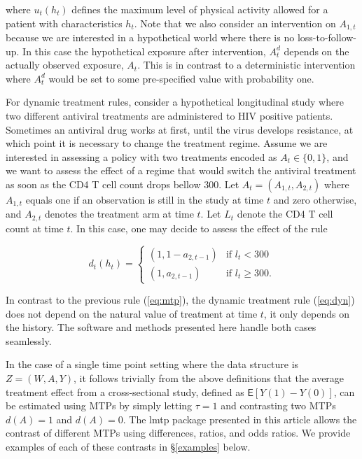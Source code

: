 \documentclass[twoside,11pt]{article}
\newcommand{\pkg}[1]{{\fontseries{b}\selectfont #1}}
\newcommand{\E}{\mathsf{E}}
\begin{document}
where $u_t(h_t)$ defines the maximum level of physical activity allowed for a patient with characteristics $h_t$. Note that we also consider an intervention on $A_{1,t}$ because we are interested in a hypothetical world where there is no loss-to-follow-up. In this case the hypothetical exposure after intervention, $A^{d}_t$ depends on the actually observed exposure, $A_t$. This is in contrast to a deterministic intervention where $A^{d}_t$ would be set to some pre-specified value with probability one.

For dynamic treatment rules, consider a hypothetical longitudinal study where two different antiviral treatments are administered to HIV positive patients. Sometimes an antiviral drug works at first, until the virus develops resistance, at which point it is necessary to change the treatment regime. Assume we are interested in assessing a policy with two treatments encoded as $A_t\in \{0,1\}$, and we want to assess the effect of a regime that would switch the antiviral treatment as soon as the CD4 T cell count drops bellow 300. Let $A_t = (A_{1, t}, A_{2, t})$ where $A_{1, t}$ equals one if an observation is still in the study at time $t$ and zero otherwise, and $A_{2, t}$ denotes the treatment arm at time $t$. Let $L_t$ denote the CD4 T cell count at time $t$. In this case, one may decide to assess the effect of the rule

\begin{equation}\label{eq:dyn}
  d_t(h_t)=
  \begin{cases}
    (1, 1 - a_{2,t-1}) & \text{if } l_t < 300  \\
    (1, a_{2,t-1}) & \text{if } l_t  \geq 300.
  \end{cases}
\end{equation}

In contrast to the previous rule (\ref{eq:mtp}), the dynamic treatment rule (\ref{eq:dyn}) does not depend on the natural value of treatment at time $t$, it only depends on the history. The software and methods presented here handle both cases seamlessly.

In the case of a single time point setting where the data structure is $Z=(W,A,Y)$, it follows trivially from the above definitions that the average treatment effect from a cross-sectional study, defined as $\E[Y(1) - Y(0)]$, can be estimated using MTPs by simply letting $\tau = 1$ and contrasting two MTPs $d(A)=1$ and $d(A)=0$. The \pkg{lmtp} package presented in this article allows the contrast of different MTPs using differences, ratios, and odds ratios. We provide examples of each of these contrasts in \S \ref{examples} below.
\end{document}
